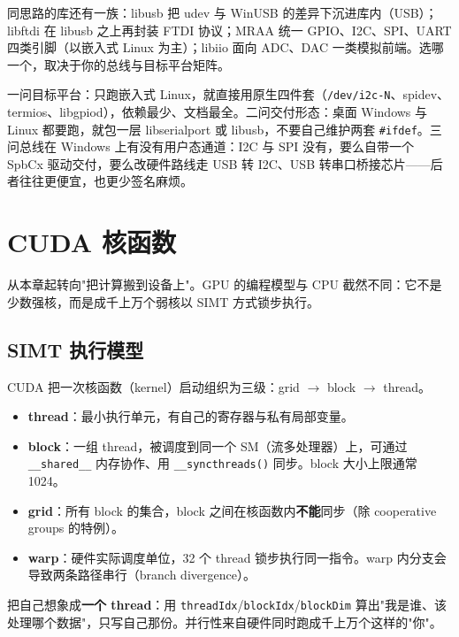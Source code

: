 \documentclass[12pt,a4paper,fontset=fandol]{ctexbook}
\newcommand{\Fn}[1]{\texttt{#1()}}
\begin{document}
同思路的库还有一族：libusb 把 udev 与 WinUSB 的差异下沉进库内（USB）；libftdi 在 libusb 之上再封装 FTDI 协议；MRAA 统一 GPIO、I2C、SPI、UART 四类引脚（以嵌入式 Linux 为主）；libiio 面向 ADC、DAC 一类模拟前端。选哪一个，取决于你的总线与目标平台矩阵。

\begin{tcolorbox}[bestpractice={选入口前先问三个问题}]
一问目标平台：只跑嵌入式 Linux，就直接用原生四件套（\texttt{/dev/i2c-N}、spidev、termios、libgpiod），依赖最少、文档最全。二问交付形态：桌面 Windows 与 Linux 都要跑，就包一层 libserialport 或 libusb，不要自己维护两套 \texttt{\#ifdef}。三问总线在 Windows 上有没有用户态通道：I2C 与 SPI 没有，要么自带一个 SpbCx 驱动交付，要么改硬件路线走 USB 转 I2C、USB 转串口桥接芯片——后者往往更便宜，也更少签名麻烦。
\end{tcolorbox}

\chapter{CUDA 核函数}\label{ch:cuda}

从本章起转向"把计算搬到设备上"。GPU 的编程模型与 CPU 截然不同：它不是少数强核，而是成千上万个弱核以 SIMT 方式锁步执行。

\section{SIMT 执行模型}\label{sec:simt}

CUDA 把一次核函数（kernel）启动组织为三级：grid $\rightarrow$ block $\rightarrow$ thread。

\begin{itemize}[nosep]
  \item \textbf{thread}：最小执行单元，有自己的寄存器与私有局部变量。
  \item \textbf{block}：一组 thread，被调度到同一个 SM（流多处理器）上，可通过 \texttt{\_\_shared\_\_} 内存协作、用 \Fn{\_\_syncthreads} 同步。block 大小上限通常 1024。
  \item \textbf{grid}：所有 block 的集合，block 之间在核函数内\textbf{不能}同步（除 cooperative groups 的特例）。
  \item \textbf{warp}：硬件实际调度单位，32 个 thread 锁步执行同一指令。warp 内分支会导致两条路径串行（branch divergence）。
\end{itemize}

\begin{tcolorbox}[guideline={写 kernel 的心智模型}]
把自己想象成\textbf{一个 thread}：用 \texttt{threadIdx}/\allowbreak{}\texttt{blockIdx}/\allowbreak{}\texttt{blockDim} 算出"我是谁、该处理哪个数据"，只写自己那份。并行性来自硬件同时跑成千上万个这样的"你"。
\end{tcolorbox}
\end{document}
